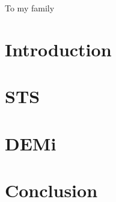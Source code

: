 

\begin{abstract}

\end{abstract}

\begin{frontmatter}

\begin{dedication}
\null\vfil
{\large
\begin{center}
To my family
\end{center}}
\null\vfil
\end{dedication}

\tableofcontents
\listoffigures %
\listoftables %



\end{frontmatter}

\chapter{Introduction}
\label{sec:intro}


\chapter{STS}
\label{sec:sts}


\chapter{DEMi}
\label{sec:demi}


\chapter{Conclusion}
\label{main_sec:conclusion}


%

%


\printbibliography


